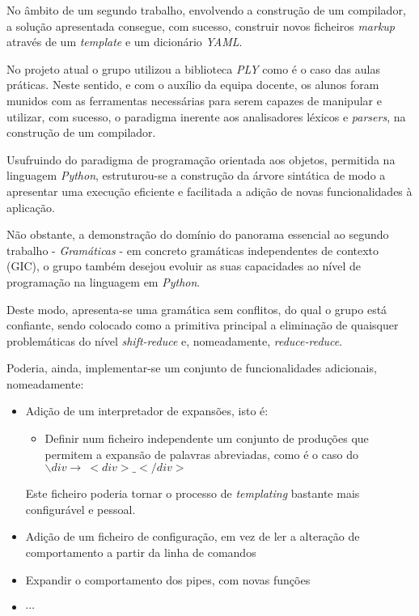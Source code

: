 \documentclass[../relatorio.tex]{subfiles}
\begin{document}
No âmbito de um segundo trabalho, envolvendo a construção de um compilador, 
a solução apresentada consegue, com sucesso, construir novos ficheiros 
\textit{markup} através de um \textit{template} e um dicionário
\textit{YAML}.

No projeto atual o grupo utilizou a biblioteca \textit{PLY} como é o caso das aulas práticas.
Neste sentido, e com o auxílio da equipa docente, os alunos foram munidos com as ferramentas 
necessárias para serem capazes de manipular e utilizar, com sucesso, o paradigma inerente aos 
analisadores léxicos e \textit{parsers}, na construção de um compilador.

Usufruindo do paradigma de programação orientada aos objetos, permitida na linguagem \textit{Python},
estruturou-se a construção da árvore sintática de modo a apresentar uma 
execução eficiente e facilitada a adição de novas funcionalidades à aplicação.

Não obstante, a demonstração do domínio do panorama essencial ao segundo trabalho 
- \textit{Gramáticas} - em concreto gramáticas independentes de contexto (GIC),
o grupo também desejou evoluir as suas capacidades ao nível de programação na 
linguagem em \textit{Python}.

Deste modo, apresenta-se uma gramática sem conflitos, do qual o grupo está 
confiante, sendo colocado como a primitiva principal a eliminação 
de quaisquer problemáticas do nível \textit{shift-reduce} e, nomeadamente,
\textit{reduce-reduce}.

Poderia, ainda, implementar-se um conjunto de funcionalidades adicionais,
nomeadamente:
\begin{itemize}
    \item Adição de um interpretador de expansões, isto é:
        \begin{itemize}
            \item Definir num ficheiro independente um conjunto de produções
            que permitem a expansão de palavras abreviadas, como é o caso 
            do $\backslash div \rightarrow\ <div>\_</div>$
        \end{itemize}
        Este ficheiro poderia tornar o processo de \textit{templating} 
        bastante mais configurável e pessoal.
    \item Adição de um ficheiro de configuração, em vez de ler a alteração 
    de comportamento a partir da linha de comandos
    \item Expandir o comportamento dos pipes, com novas funções
    \item $\cdots$
\end{itemize}
\end{document}
